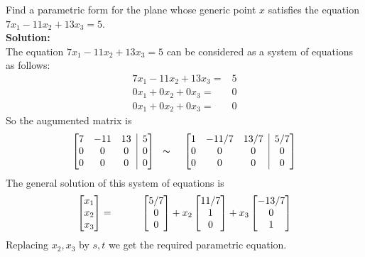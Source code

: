 \documentclass[math101_lecturenotes_ku.tex]{subfiles}
\begin{document}
\begin{example}
    Find a parametric form for the plane whose generic point $x$ satisfies the equation $7x_1-11x_2+13x_3 = 5$. \\[1mm]
    \textbf{Solution:}\\[1mm]
    The equation $7x_1-11x_2+13x_3 = 5$ can be considered as a system of equations as follows:
    \begin{align*}
        7x_1-11x_2+13x_3 =& 5 \\
        0x_1+0x_2+0x_3 =& 0 \\
        0x_1+0x_2+0x_3 =& 0
    \end{align*}
    So the augumented matrix is
    $$ \left[ \begin{matrix}
    7 & -11 & 13 \\
    0 & 0 & 0 \\
    0 & 0 & 0
\end{matrix} \;\; \vline \;\;
\begin{matrix}
    5\\ 0\\ 0
\end{matrix} \right] \hspace{2mm} \thicksim \hspace{4mm} \left[ \begin{matrix}
    1 & -11/7 & 13/7 \\
    0 & 0 & 0 \\
    0 & 0 & 0
\end{matrix} \;\; \vline \;\;
\begin{matrix}
    5/7\\ 0\\ 0
\end{matrix} \right]$$
The general solution of this system of equations is $$ \begin{bmatrix}
    x_1 \\ x_2 \\ x_3
\end{bmatrix} = \hspace{10mm}\begin{bmatrix}
    5/7 \\ 0 \\0
\end{bmatrix} + x_2 \begin{bmatrix}
    11/7\\ 1 \\ 0
\end{bmatrix} + x_3 \begin{bmatrix}
    -13/7 \\0 \\1
\end{bmatrix}$$
Replacing $x_2, x_3$ by $s,t$ we get the required parametric equation.
\end{example}
\end{document}
